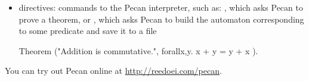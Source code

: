 \documentclass[landscape,usenames,dvipsnames]{sciposter}
\begin{document}
\begin{multicols}{3}
\begin{itemize}
    \item directives: commands to the Pecan interpreter, such as: , which asks Pecan to prove a theorem, or , which asks Pecan to build the automaton corresponding to some predicate and save it to a file
\begin{pecan}
Theorem ("Addition is commutative.", { forallx,y. x + y = y + x }).
\end{pecan}

\end{itemize}

You can try out Pecan online at \url{http://reedoei.com/pecan}.









\end{multicols}
\end{document}
